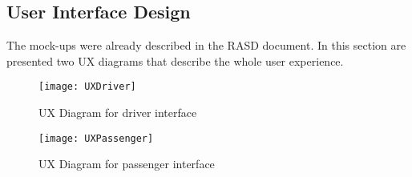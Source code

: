 
\begin{landscape}
\section{User Interface Design}

The mock-ups were already described in the RASD document. In this section are presented two UX diagrams that describe the whole user experience.

\begin{figure}[h!]
        \centering
        \texttt{[image: UXDriver]}
        \caption{UX Diagram for driver interface}
        \label{fig:uxdriver}
\end{figure}
\end{landscape}

\begin{landscape}
\begin{figure}[]
        \centering
        \texttt{[image: UXPassenger]}
        \caption{UX Diagram for passenger interface}
        \label{fig:uxpassenger}
\end{figure}
\end{landscape}